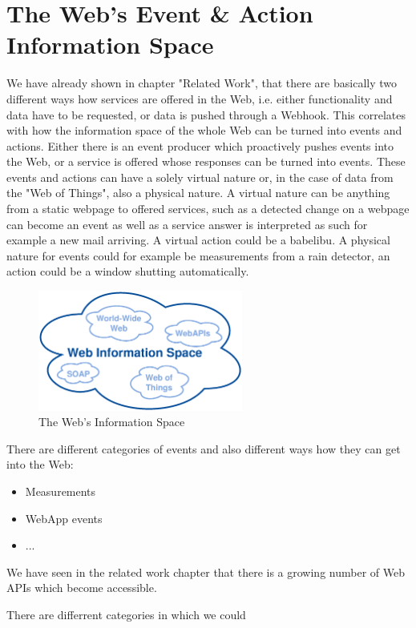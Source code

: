 \section{The Web's Event \& Action Information Space}
We have already shown in chapter "Related Work", that there are basically two different ways how services are offered in the Web, i.e. either functionality and data have to be requested, or data is pushed through a Webhook.
This correlates with how the information space of the whole Web can be turned into events and actions.
Either there is an event producer which proactively pushes events into the Web, or a service is offered whose responses can be turned into events.
These events and actions can have a solely virtual nature or, in the case of data from the "Web of Things", also a physical nature.
A virtual nature can be anything from a static webpage to offered services, such as a detected change on a webpage can become an event as well as a service answer is interpreted as such for example a new mail arriving.
A virtual action could be a babelibu.
A physical nature for events could for example be measurements from a rain detector, an action could be a window shutting automatically.

\begin{figure}[!ht]
  \centering
  \includegraphics[width=0.6\textwidth]{figures/InformationSpace}
  \caption{The Web's Information Space}
  \label{fig:InformationSpace}
\end{figure}
There are different categories of events and also different ways how they can get into the Web:
\begin{itemize}
  \item Measurements
  \item WebApp events
  \item ...
\end{itemize}

We have seen in the related work chapter that there is a growing number of Web APIs which become accessible.


There are differrent categories in which we could 


